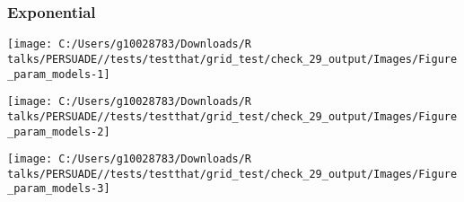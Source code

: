 \documentclass[
]{article}
\begin{document}
\clearpage

\begin{table}[H]
\centering
\caption{\label{tab:Table_2}Goodness of fit statistics}
\centering
{}
\end{table}

\clearpage

\clearpage

\subsubsection{Exponential}\label{exponential}

\begin{flushleft}\texttt{[image: C:/Users/g10028783/Downloads/R talks/PERSUADE//tests/testthat/grid\_test/check\_29\_output/Images/Figure\_param\_models-1]} \end{flushleft}

\begin{flushleft}\texttt{[image: C:/Users/g10028783/Downloads/R talks/PERSUADE//tests/testthat/grid\_test/check\_29\_output/Images/Figure\_param\_models-2]} \end{flushleft}

\begin{flushleft}\texttt{[image: C:/Users/g10028783/Downloads/R talks/PERSUADE//tests/testthat/grid\_test/check\_29\_output/Images/Figure\_param\_models-3]} \end{flushleft}

\clearpage
\end{document}
